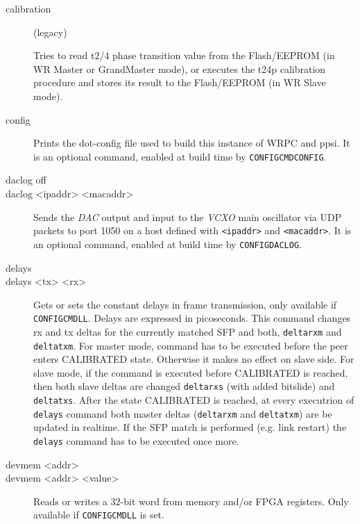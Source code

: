 \documentclass[a4paper, 12pt]{article}
\renewcommand{\_}{\underscore\allowbreak}
\newcommand{\code}[1]{\texttt{#1}}
\begin{document}
\begin{description}
\item[calibration] (legacy)

  Tries to read t2/4 phase transition value from
  the Flash/EEPROM (in WR Master or GrandMaster mode), or executes the t24p
  calibration procedure and stores its result to the Flash/EEPROM (in WR
  Slave mode).

\item[config] \mbox{}

  Prints the dot-config file used to build this instance of
  WRPC and ppsi. It is an optional command, enabled at build time by
  \texttt{CONFIG\_CMD\_CONFIG}.

\item[daclog off]
\item[daclog <ipaddr> <macaddr>] \mbox{}

  Sends the \textit{DAC} output and input to
  the \textit{VCXO} main oscillator via UDP packets to port 1050 on
  a host defined with \code{<ipaddr>} and \code{<macaddr>}.
  It is an optional command, enabled at build time by \texttt{CONFIG\_DACLOG}.

\item[delays]
\item[delays <tx> <rx>] \mbox{}

  Gets or sets the constant delays in frame
  transmission, only available if \texttt{CONFIG\_CMD\_LL}. Delays are
  expressed in picoseconds. This command changes rx and tx deltas for
  the currently matched SFP and both, \code{delta\_rxm} and \code{delta\_txm}.
  For master mode, command has to be executed before the peer enters
  CALIBRATED state. Otherwise it makes no effect on slave side. For slave mode,
  if the command is executed before CALIBRATED is reached, then both slave
  deltas are changed \code{delta\_rxs} (with added bitslide) and
  \code{delta\_txs}. After the state CALIBRATED is reached, at every
  executrion of \code{delays} command both master deltas (\code{delta\_rxm}
  and \code{delta\_txm}) are be updated in realtime.
  If the SFP match is performed (e.g. link restart) the \code{delays} command
  has to be executed once more.

\item[devmem <addr>]
\item[devmem <addr> <value>] \mbox{}

  Reads or writes a 32-bit word from memory
  and/or FPGA registers. Only available if \texttt{CONFIG\_CMD\_LL} is set.


\end{description}
\end{document}
